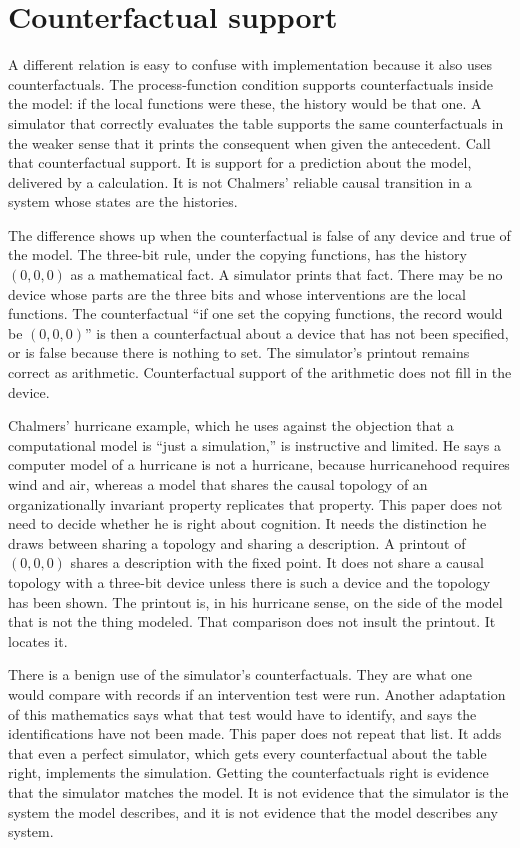 \documentclass[11pt]{article}
\begin{document}
\section{Counterfactual support}
\label{sec:cf}

A different relation is easy to confuse with implementation because it also uses counterfactuals. The process-function condition supports counterfactuals inside the model: if the local functions were these, the history would be that one. A simulator that correctly evaluates the table supports the same counterfactuals in the weaker sense that it prints the consequent when given the antecedent. Call that counterfactual support. It is support for a prediction about the model, delivered by a calculation. It is not Chalmers' reliable causal transition in a system whose states are the histories.

The difference shows up when the counterfactual is false of any device and true of the model. The three-bit rule, under the copying functions, has the history \((0,0,0)\) as a mathematical fact. A simulator prints that fact. There may be no device whose parts are the three bits and whose interventions are the local functions. The counterfactual ``if one set the copying functions, the record would be \((0,0,0)\)'' is then a counterfactual about a device that has not been specified, or is false because there is nothing to set. The simulator's printout remains correct as arithmetic. Counterfactual support of the arithmetic does not fill in the device.

Chalmers' hurricane example, which he uses against the objection that a computational model is ``just a simulation,'' is instructive and limited. He says a computer model of a hurricane is not a hurricane, because hurricanehood requires wind and air, whereas a model that shares the causal topology of an organizationally invariant property replicates that property. This paper does not need to decide whether he is right about cognition. It needs the distinction he draws between sharing a topology and sharing a description. A printout of \((0,0,0)\) shares a description with the fixed point. It does not share a causal topology with a three-bit device unless there is such a device and the topology has been shown. The printout is, in his hurricane sense, on the side of the model that is not the thing modeled. That comparison does not insult the printout. It locates it.

There is a benign use of the simulator's counterfactuals. They are what one would compare with records if an intervention test were run. Another adaptation of this mathematics says what that test would have to identify, and says the identifications have not been made. This paper does not repeat that list. It adds that even a perfect simulator, which gets every counterfactual about the table right, implements the simulation. Getting the counterfactuals right is evidence that the simulator matches the model. It is not evidence that the simulator is the system the model describes, and it is not evidence that the model describes any system.
\end{document}
